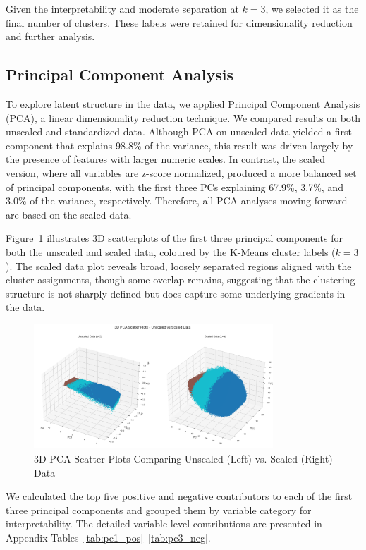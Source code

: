 \documentclass{article}
\begin{document}
Given the interpretability and moderate separation at $k=3$, we selected it as the final number of clusters. These labels were retained for dimensionality reduction and further analysis.


\subsection{Principal Component Analysis}

To explore latent structure in the data, we applied Principal Component Analysis (PCA), a linear dimensionality reduction technique. We compared results on both unscaled and standardized data. Although PCA on unscaled data yielded a first component that explains 98.8\% of the variance, this result was driven largely by the presence of features with larger numeric scales. In contrast, the scaled version, where all variables are z-score normalized, produced a more balanced set of principal components, with the first three PCs explaining 67.9\%, 3.7\%, and 3.0\% of the variance, respectively. Therefore, all PCA analyses moving forward are based on the scaled data.

Figure~\ref{fig:pca3d} illustrates 3D scatterplots of the first three principal components for both the unscaled and scaled data, coloured by the K-Means cluster labels ($k=3$). The scaled data plot reveals broad, loosely separated regions aligned with the cluster assignments, though some overlap remains, suggesting that the clustering structure is not sharply defined but does capture some underlying gradients in the data.

\begin{figure}[H]
    \centering
    \includegraphics[width=0.8\textwidth]{figures/pca3d_scaled_vs_unscaled.png}
    \caption{3D PCA Scatter Plots Comparing Unscaled (Left) vs. Scaled (Right) Data}
    \label{fig:pca3d}
\end{figure}

We calculated the top five positive and negative contributors to each of the first three principal components and grouped them by variable category for interpretability. The detailed variable-level contributions are presented in Appendix Tables~\ref{tab:pc1_pos}--\ref{tab:pc3_neg}.
\end{document}
